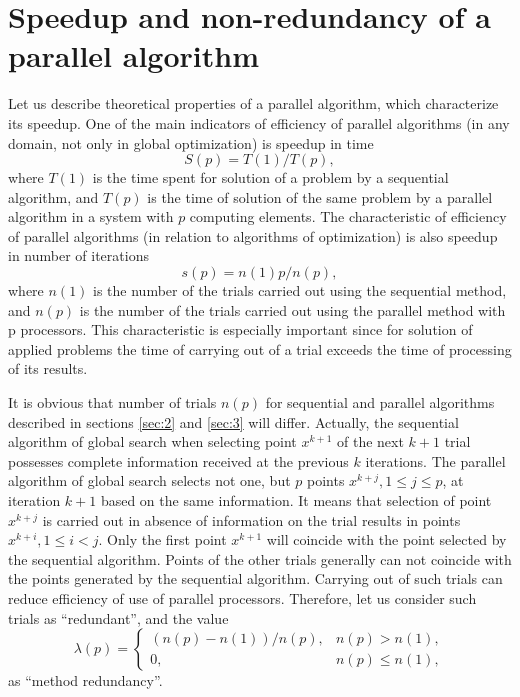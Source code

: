 \documentclass[smallcondensed]{svjour3}     %
\begin{document}
\section{Speedup and non-redundancy of a parallel algorithm} \label{sec:4}

Let us describe theoretical properties of a parallel algorithm, which characterize its speedup. One of the main indicators of efficiency of parallel algorithms (in any domain, not only in global optimization) is speedup in time
\[
S(p)=T(1)/T(p),
\]
where $T(1)$ is the time spent for solution of a problem by a sequential algorithm, and $T(p)$ is the time of solution of the same problem by a parallel algorithm in a system with $p$ computing elements. The characteristic of efficiency of parallel algorithms (in relation to algorithms of optimization) is also speedup in number of iterations
\begin{equation}\label{eq:26}
s(p)=n(1)p/n(p),
\end{equation}
where $n(1)$ is the number of the trials carried out using the sequential method, and $n(p)$ is the number of the trials carried out using the parallel method with p processors. This characteristic is especially important since for solution of applied problems the time of carrying out of a trial exceeds the time of processing of its results.

It is obvious that number of trials $n(p)$ for sequential and parallel algorithms described in sections \ref{sec:2} and \ref{sec:3} will differ. Actually, the sequential algorithm of global search when selecting point $x^{k+1}$ of the next $k+1$ trial possesses complete information received at the previous $k$ iterations. The parallel algorithm of global search selects not one, but $p$ points $x^{k+j}, 1\leq j \leq p$,  at iteration $k+1$ based on the same information. It means that selection of point $x^{k+j}$ is carried out in absence of information on the trial results in points $x^{k+i}, 1\leq i<j$. Only the first point $x^{k+1}$ will coincide with the point selected by the sequential algorithm. Points of the other trials generally can not coincide with the points generated by the sequential algorithm. Carrying out of such trials can reduce efficiency of use of parallel processors. Therefore, let us consider such trials as ``redundant'', and the value 
\[
\lambda(p) = \left\{
   \begin{array}{lr}
     (n(p)-n(1))/n(p), & n(p) > n(1),\\
     0, & n(p)\leq n(1),
   \end{array}
\right.
\]
as ``method redundancy''.
\end{document}
